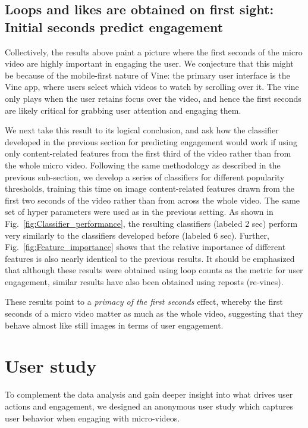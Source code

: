 \subsection{Loops and likes are obtained on first sight: Initial seconds predict engagement}
\label{sec:first-seconds}
Collectively, the results above paint a picture where the first seconds of the micro video are highly important in engaging the user. We conjecture that this might be because of the mobile-first nature of Vine: the primary user interface is the Vine app, where users select which videos to watch by scrolling over it. The vine only plays when the user retains focus over the video, and hence the first seconds are likely critical for grabbing user attention and engaging them. 

We next take this result to its logical conclusion, and ask how the classifier developed in the previous section for predicting engagement would work if using only content-related features from the first third of the video rather than from the whole micro video. Following the same methodology as described in the previous sub-section, we develop a series of classifiers for different popularity thresholds, training this time on image content-related features drawn from the first two seconds of the video rather than from across the whole video. The same set of hyper parameters were used as in the previous setting. As shown in Fig.~\ref{fig:Classifier_performance}, the resulting classifiers (labeled 2 sec) perform very similarly to the classifiers developed before (labeled 6 sec). Further, Fig.~\ref{fig:Feature_importance} shows that the relative importance of different features is also nearly identical to the previous results. It should be emphasized that although these results were obtained using loop counts as the metric for user engagement, similar results have also been obtained using reposts (re-vines). 

These results point to a \emph{primacy of the first seconds} effect, whereby the first seconds of a micro video matter as much as the whole video, suggesting that they behave almost like still images in terms of user engagement.


\section{User study}
\label{sec:userstudy}
To complement the data analysis and gain deeper insight into what drives user actions and engagement, we designed an anonymous user study
which captures user behavior when engaging with micro-videos. 

